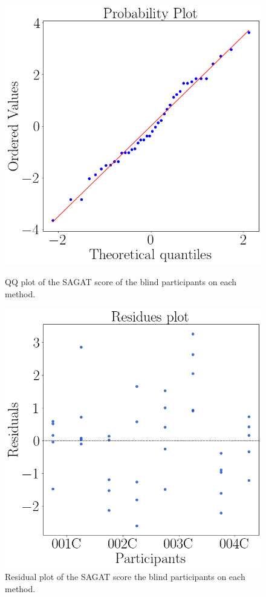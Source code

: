 \begin{figure}[!htb]
    \centering
    \begin{minipage}{0.45\textwidth}
        \centering
        \includegraphics[width = 0.8\linewidth]{Resultados/Sagat/Figuras/png/qqplot_sagat_avg_two_way_blind.png}
        \caption{QQ plot of the SAGAT score of the blind participants on each method.}
        \label{fig:qqplot_sagat_avg_two_way_blind}
    \end{minipage}
    \begin{minipage}{0.45\textwidth}
        \centering
        \includegraphics[width = 0.8\linewidth]{Resultados/Sagat/Figuras/png/residplot_sagat_avg_two_way_blind.png}
        \caption{Residual plot of the SAGAT score the blind participants on each method.}
        \label{fig:residplot_sagat_avg_two_way_blind}
    \end{minipage}
\end{figure}

